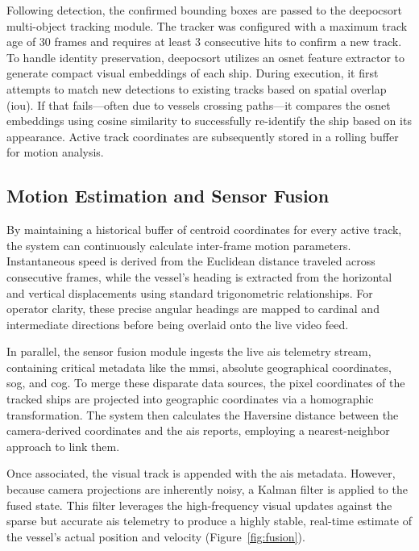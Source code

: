 Following detection, the confirmed bounding boxes are passed to the \gls{deepocsort} multi-object tracking module. The tracker was configured with a maximum track age of 30 frames and requires at least 3 consecutive hits to confirm a new track. To handle identity preservation, \gls{deepocsort} utilizes an \gls{osnet} feature extractor to generate compact visual embeddings of each ship. During execution, it first attempts to match new detections to existing tracks based on spatial overlap (\gls{iou}). If that fails—often due to vessels crossing paths—it compares the \gls{osnet} embeddings using cosine similarity to successfully re-identify the ship based on its appearance. Active track coordinates are subsequently stored in a rolling buffer for motion analysis.

\subsection{Motion Estimation and Sensor Fusion}

By maintaining a historical buffer of centroid coordinates for every active track, the system can continuously calculate inter-frame motion parameters. Instantaneous speed is derived from the Euclidean distance traveled across consecutive frames, while the vessel's heading is extracted from the horizontal and vertical displacements using standard trigonometric relationships. For operator clarity, these precise angular headings are mapped to cardinal and intermediate directions before being overlaid onto the live video feed.

In parallel, the sensor fusion module ingests the live \gls{ais} telemetry stream, containing critical metadata like the \gls{mmsi}, absolute geographical coordinates, \gls{sog}, and \gls{cog}. To merge these disparate data sources, the pixel coordinates of the tracked ships are projected into geographic coordinates via a homographic transformation. The system then calculates the Haversine distance between the camera-derived coordinates and the \gls{ais} reports, employing a nearest-neighbor approach to link them. 

Once associated, the visual track is appended with the \gls{ais} metadata. However, because camera projections are inherently noisy, a Kalman filter is applied to the fused state. This filter leverages the high-frequency visual updates against the sparse but accurate \gls{ais} telemetry to produce a highly stable, real-time estimate of the vessel's actual position and velocity (Figure~\ref{fig:fusion}).

